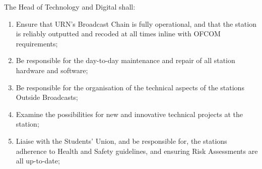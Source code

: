 \item The Head of Technology and Digital shall:
\begin{enumerate}[label*=\arabic*.]
    \item Ensure that URN's Broadcast Chain is fully operational, and that the station is reliably outputted and recoded at all times inline with OFCOM requirements;
    \item Be responsible for the day-to-day maintenance and repair of all station hardware and software;
    \item Be responsible for the organisation of the technical aspects of the stations Outside Broadcasts;
    \item Examine the possibilities for new and innovative technical projects at the station;
    \item Liaise with the Students' Union, and be responsible for, the stations adherence to Health and Safety guidelines, and ensuring Risk Assessments are all up-to-date;
\end{enumerate}

